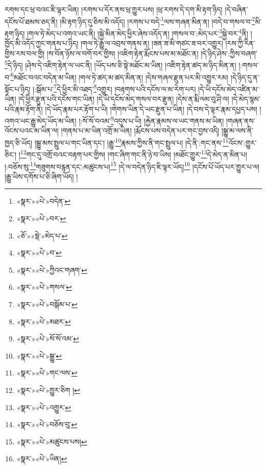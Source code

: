 རགས་དང་ཕྲ་བའང་ཇི་ལྟར་ཡིན། །རགས་པ་དོར་ནས་ཕྲ་གྱུར་པས། །ཕྲ་རགས་དེ་དག་མི་རྟག་ཉིད། །དེ་བཞིན་དངོས་པོ་ཐམས་ཅད་ནི། །མི་རྟག་ཉིད་དུ་ཅིས་མི་འདོད། །རགས་པ་བདེ་\footnote{«སྣར་»«པེ་»བདེན་}ལས་གཞན་མིན་ན། །བདེ་བ་གསལ་བ་\footnote{«སྣར་»«པེ་»བར་}མི་རྟག་ཉིད། །གལ་ཏེ་མེད་པ་འགའ་ཡང་ནི། །སྐྱེ་མིན་མེད་ཕྱིར་ཞེས་འདོད་ན། །གསལ་བ་:མེད་པར་\footnote{«ཅོ་»«སྡེ་»མེད་པ་}སྐྱེ་བར་\footnote{«སྣར་»«པེ་»བ་}ནི། །ཁྱོད་མི་འདོད་ཀྱང་གནས་པ་ཉིད། །གལ་ཏེ་རྒྱུ་ལ་འབྲས་གནས་ན། །ཟན་ཟ་མི་གཙང་ཟ་བར་འགྱུར། །རས་ཀྱི་རིན་གྱིས་རས་བལ་གྱི། །ས་བོན་ཉོས་ལ་བགོ་བར་གྱིས། །འཇིག་རྟེན་རྨོངས་པས་མ་མཐོང་ན། །དེ་ཉིད་ཤེས་:ཀྱིས་བཞག་\footnote{«སྣར་»«པེ་»ཀྱིའང་གཞག་}དེ་ཉིད། །ཤེས་དེ་འཇིག་རྟེན་ལ་ཡང་ནི། །ཡོད་པས་ཅི་སྟེ་མཐོང་མ་ཡིན། །འཇིག་རྟེན་ཚད་མ་ཉིད་མིན་ན། །:གསལ་བ་\footnote{«སྣར་»«པེ་»གསལ་}མཐོང་བའང་བདེན་མ་ཡིན། །གལ་ཏེ་ཚད་མ་ཚད་མིན་ན། །དེས་གཞལ་རྫུན་པར་མི་འགྱུར་རམ། །དེ་ཉིད་དུ་ན་སྟོང་པ་ཉིད། །:སྒོམ་པ་\footnote{«སྣར་»«པེ་»བསྒོམ་པ་}དེ་ཕྱིར་མི་འཐད་\footnote{«སྣར་»«པེ་»མཐར་}འགྱུར། །བརྟགས་པའི་དངོས་ལ་མ་རེག་པར། །དེ་ཡི་དངོས་མེད་འཛིན་མ་ཡིན། །དེ་ཕྱིར་རྫུན་པའི་དངོས་གང་ཡིན། །དེ་ཡི་དངོས་མེད་གསལ་བར་རྫུན། །དེས་ན་རྨི་ལམ་བུ་ཤི་ལ། །དེ་མེད་སྙམ་པའི་རྣམ་རྟོག་ནི། །དེ་ཡོད་རྣམ་པར་རྟོག་པ་ཡི། །གེགས་ཡིན་དེ་ཡང་རྫུན་པ་ཡིན། །དེ་བས་དེ་ལྟར་རྣམ་དཔྱད་པས། །འགའ་ཡང་རྒྱུ་མེད་ཡོད་མ་ཡིན། །:སོ་སོ་བའམ་\footnote{«སྣར་»«པེ་»སོ་སོ་འམ་}འདུས་པ་ཡི། །རྐྱེན་རྣམས་ལ་ཡང་གནས་མ་ཡིན། །གཞན་ནས་འོངས་པའང་མ་ཡིན་ལ། །གནས་པ་མ་ཡིན་འགྲོ་མ་ཡིན། །རྨོངས་པས་བདེན་པར་གང་བྱས་འདི། །སྒྱུ་མ་ལས་ནི་ཁྱད་ཅི་ཡོད། །སྒྱུ་མས་སྤྲུལ་པ་གང་ཡིན་དང་། །རྒྱུ་\footnote{«སྣར་»«པེ་»སྒྱུ་}རྣམས་ཀྱིས་ནི་གང་སྤྲུལ་པ། །དེ་ནི་:གང་ནས་\footnote{«སྣར་»«པེ་»གང་ལས་}འོངས་:གྱུར་ཅིང་། །\footnote{«སྣར་»«པེ་»གྱུར་ཅིག །}གང་དུ་འགྲོ་བའང་བརྟག་པར་གྱིས། །གང་ཞིག་གང་ནི་ཉེ་བ་ཡིས། །མཐོང་གྱུར་\footnote{«སྣར་»«པེ་»འགྱུར་}དེ་མེད་ན་མིན་པ། །:བཅོས་སུ་\footnote{«སྣར་»«པེ་»བཅོས་བུ་}གཟུགས་བརྙན་དང་:མཚུངས་པ།\footnote{«སྣར་»«པེ་»མཚུངས་པས།} །དེ་ལ་བདེན་ཉིད་ཇི་ལྟར་ཡོད།\footnote{«སྣར་»«པེ་»ཡིན།} །དངོས་པོ་ཡོད་པར་གྱུར་པ་ལ། །རྒྱུ་ཡིས་དགོས་པ་ཅི་ཞིག་ཡོད། །
